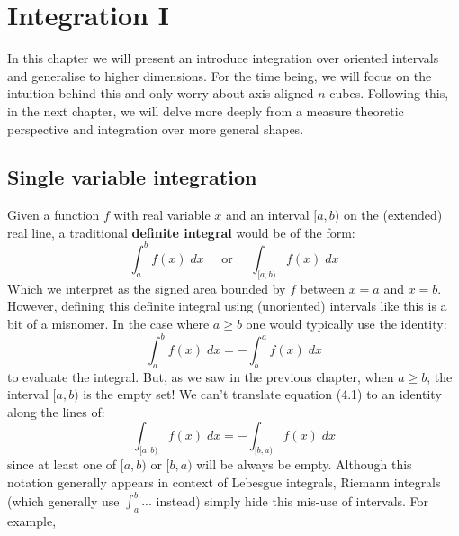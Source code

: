 \chapter{Integration I}

In this chapter we will present an introduce integration over oriented intervals and generalise to higher dimensions.
For the time being, we will focus on the intuition behind this and only worry about axis-aligned $n$-cubes.
Following this, in the next chapter, we will delve more deeply from a measure theoretic perspective and integration over more general shapes.

\section{Single variable integration}

Given a function $f$ with real variable $x$ and an interval $[a,b)$ on the (extended) real line, 
a traditional \textbf{definite integral} would be of the form:
\begin{equation*}
	\int_a^b f(x) \; dx \;\;\;\;\; \text{or} \;\;\;\;\; \int_{[a,b)} f(x) \; dx
\end{equation*}
Which we interpret as the signed area bounded by $f$ between $x=a$ and $x=b$.
However, defining this definite integral using (unoriented) intervals like this is a bit of a misnomer.
In the case where $a \geq b$ one would typically use the identity:
\begin{equation}
	\int_a^b f(x) \; dx = - \int_b^a f(x) \; dx
\end{equation}
to evaluate the integral.
But, as we saw in the previous chapter, when $a \geq b$, the interval $[a,b)$ is the empty set!
We can't translate equation (4.1) to an identity along the lines of:
\begin{equation}
	\int_{[a,b)} f(x) \; dx = - \int_{[b,a)} f(x) \; dx
\end{equation}
since at least one of $[a,b)$ or $[b,a)$ will be always be empty.
Although this notation generally appears in context of Lebesgue integrals, 
Riemann integrals (which generally use $\int_a^b ...$ instead) simply hide this mis-use of intervals.
For example, 

